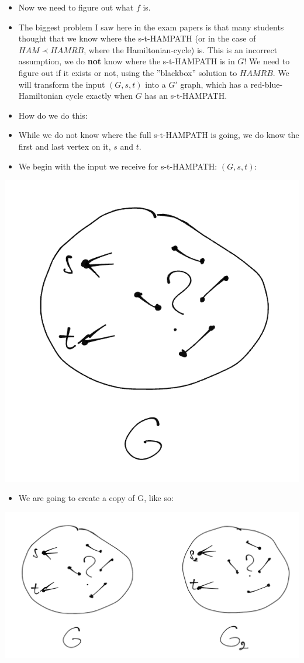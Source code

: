 \begin{itemize}
    \item Now we need to figure out what $f$ is.
    \item The biggest problem I saw here in the exam papers is that many students thought that we know where the s-t-HAMPATH (or in the case of $HAM \prec HAMRB$, where the Hamiltonian-cycle) is. This is an incorrect assumption, we do \textbf{not} know where the s-t-HAMPATH is in $G$! We need to figure out if it exists or not, using the ''blackbox'' solution to $HAMRB$. We will transform the input $(G,s,t)$ into a $G'$ graph, which has a red-blue-Hamiltonian cycle exactly when $G$ has an s-t-HAMPATH.
    \item How do we do this:
    \item While we do not know where the full s-t-HAMPATH is going, we do know the first and last vertex on it, $s$ and $t$.
    \item We begin with the input we receive for s-t-HAMPATH: $(G,s,t)$:
\end{itemize}

\begin{center}
\includegraphics[width=0.4\linewidth]{./exams/2022_05_30/03/karp_0.png}
\end{center}

\begin{itemize}
    \item We are going to create a copy of G, like so:
\end{itemize}

\begin{center}
\includegraphics[width=0.9\linewidth]{./exams/2022_05_30/03/karp_1.png}
\end{center}

